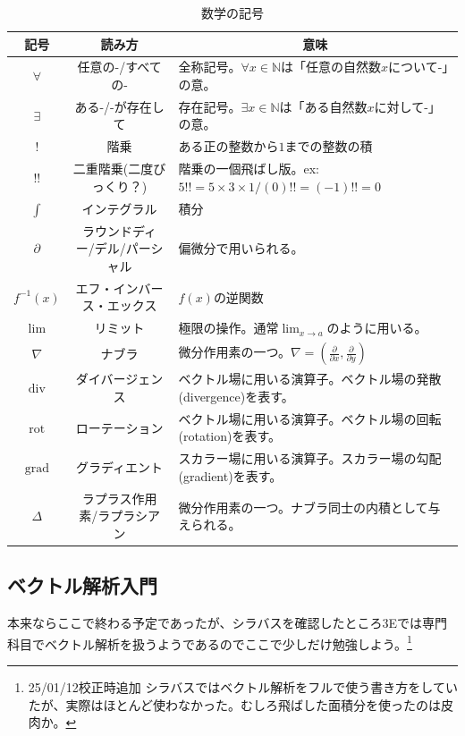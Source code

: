 \documentclass[a4j,dvipdfmx]{jsarticle}
\begin{document}
\begin{table}[h]
                    \caption*{数学の記号}
                    \centering
                    \begin{tabular}{|c|c|l|}\hline
                        記号 & 読み方 & \multicolumn{1}{c|}{意味}\\\hline
                        $\forall$ & 任意の-/すべての- & 全称記号。$\forall x \in \mathbb{N}$は「任意の自然数$x$について-」の意。\\\hline
                        $\exists$ & ある-/-が存在して & 存在記号。$\exists x \in \mathbb{N}$は「ある自然数$x$に対して-」の意。 \\\hline
                        $!$ & 階乗 & ある正の整数から$1$までの整数の積\\\hline
                        $!!$ & 二重階乗(二度びっくり？) & 階乗の一個飛ばし版。ex:\hspace{1mm}$5!!=5\times3\times1/(0)!!=(-1)!!=0$\\\hline
                        $\int$ & インテグラル & 積分 \\\hline
                        $\partial$ & ラウンドディー/デル/パーシャル & 偏微分で用いられる。\\\hline
                        $f^{-1}(x)$ & エフ・インバース・エックス & $f(x)$の逆関数\\\hline
                        $\lim$ & リミット & 極限の操作。通常$\displaystyle\lim_{x\to a}$のように用いる。\\\hline
                        $\nabla$ & ナブラ & 微分作用素の一つ。$\nabla=\left(\frac{\partial}{\partial x},\frac{\partial}{\partial y}\right)$\\\hline
                        $\mathrm{div}$ & ダイバージェンス & ベクトル場に用いる演算子。ベクトル場の発散(divergence)を表す。\\\hline
                        $\mathrm{rot}$ & ローテーション & ベクトル場に用いる演算子。ベクトル場の回転(rotation)を表す。\\\hline
                        $\mathrm{grad}$ & グラディエント & スカラー場に用いる演算子。スカラー場の勾配(gradient)を表す。\\\hline
                        $\varDelta$ & ラプラス作用素/ラプラシアン & 微分作用素の一つ。ナブラ同士の内積として与えられる。\\\hline
                    \end{tabular}
                \end{table}
        \clearpage
        \subsection{ベクトル解析入門}
            本来ならここで終わる予定であったが、シラバスを確認したところ3Eでは専門科目でベクトル解析を扱うようであるのでここで少しだけ勉強しよう。\footnote{25/01/12校正時追加 シラバスではベクトル解析をフルで使う書き方をしていたが、実際はほとんど使わなかった。むしろ飛ばした面積分を使ったのは皮肉か。}\\
\end{document}
